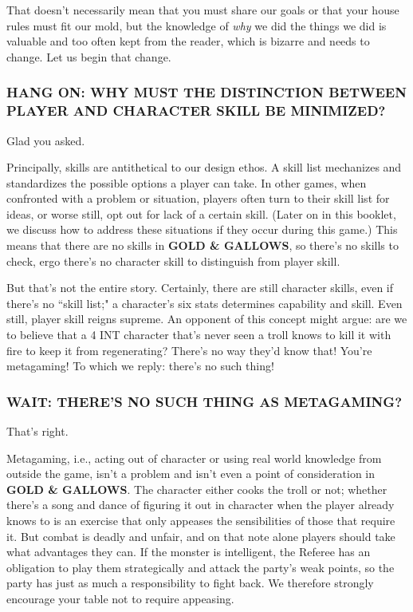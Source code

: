 \documentclass[twoside]{article}
\begin{document}
\bigbreak

That doesn't necessarily mean that you must share our goals or that your house rules must fit our mold, but the knowledge of \textit{why} we did the things we did is valuable and too often kept from the reader, which is bizarre and needs to change. Let us begin that change.

\subsubsection*{\footnotesize{H}\scriptsize{ANG ON: WHY MUST THE DISTINCTION BETWEEN PLAYER AND CHARACTER SKILL BE MINIMIZED?}\normalsize}

Glad you asked.

\bigbreak

Principally, skills are antithetical to our design ethos. A skill list mechanizes and standardizes the possible options a player can take. In other games, when confronted with a problem or situation, players often turn to their skill list for ideas, or worse still, opt out for lack of a certain skill. (Later on in this booklet, we discuss how to address these situations if they occur during this game.) This means that there are no skills in \textbf{GOLD \& GALLOWS}, so there's no skills to check, ergo there's no character skill to distinguish from player skill.

\bigbreak

But that's not the entire story. Certainly, there are still character skills, even if there's no ``skill list;" a character's six stats determines capability and skill. Even still, player skill reigns supreme. An opponent of this concept might argue: are we to believe that a 4 INT character that's never seen a troll knows to kill it with fire to keep it from regenerating? There's no way they'd know that! You're metagaming! To which we reply: there's no such thing!

\subsubsection*{\footnotesize{W}\scriptsize{AIT: THERE'S NO SUCH THING AS METAGAMING?}\normalsize}

That's right.

\bigbreak

Metagaming, i.e., acting out of character or using real world knowledge from outside the game, isn't a problem and isn't even a point of consideration in \textbf{GOLD \& GALLOWS}. The character either cooks the troll or not; whether there's a song and dance of figuring it out in character when the player already knows to is an exercise that only appeases the sensibilities of those that require it. But combat is deadly and unfair, and on that note alone players should take what advantages they can. If the monster is intelligent, the Referee has an obligation to play them strategically and attack the party's weak points, so the party has just as much a responsibility to fight back. We therefore strongly encourage your table not to require appeasing.
\end{document}

